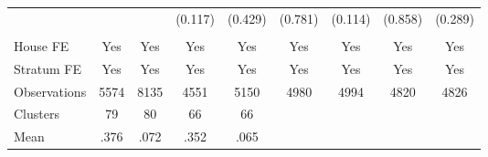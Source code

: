 {\begin{tabular}{l*{8}{c}}
                &         &         &  (0.117)&  (0.429)&  (0.781)&  (0.114)&  (0.858)&  (0.289)\\
                &         &         &         &         &         &         &         &         \\
House FE        &      Yes&      Yes&      Yes&      Yes&      Yes&      Yes&      Yes&      Yes\\
Stratum FE      &      Yes&      Yes&      Yes&      Yes&      Yes&      Yes&      Yes&      Yes\\
\midrule
Observations    &     5574&     8135&     4551&     5150&     4980&     4994&     4820&     4826\\
Clusters        &       79&       80&       66&       66&         &         &         &         \\
Mean            &     .376&     .072&     .352&     .065&         &         &         &         \\
\bottomrule
\end{tabular}
}
